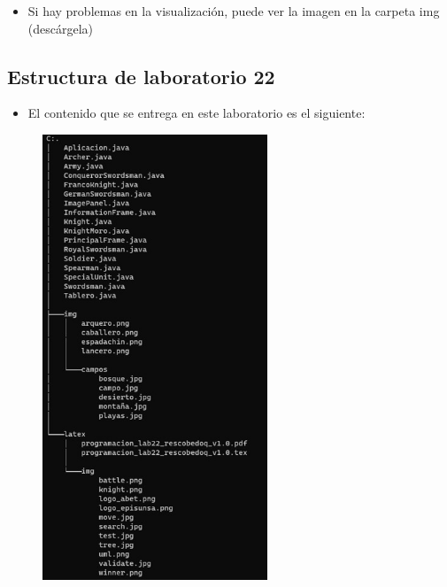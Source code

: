 \documentclass{article}
\begin{document}
	\begin{itemize}	
			\item Si hay problemas en la visualización, puede ver la imagen en la carpeta img (descárgela)
	\end{itemize}
	
	
	
	
	
	\subsection{Estructura de laboratorio 22}
	\begin{itemize}	
		\item El contenido que se entrega en este laboratorio es el siguiente:
	\end{itemize}
	


	\begin{figure}[H]
		\centering
		\includegraphics[width=0.6\textwidth,keepaspectratio]{img/tree.jpg}
	\end{figure}	
	
\end{document}
